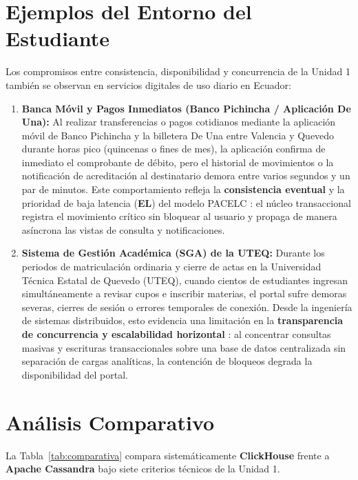 \documentclass[12pt,a4paper]{article}
\begin{document}
\section{Ejemplos del Entorno del Estudiante}
Los compromisos entre consistencia, disponibilidad y concurrencia de la Unidad 1 también se observan en servicios digitales de uso diario en Ecuador:

\begin{enumerate}[leftmargin=1.2cm]
    \item \textbf{Banca Móvil y Pagos Inmediatos (Banco Pichincha / Aplicación De Una):} Al realizar transferencias o pagos cotidianos mediante la aplicación móvil de Banco Pichincha y la billetera De Una entre Valencia y Quevedo durante horas pico (quincenas o fines de mes), la aplicación confirma de inmediato el comprobante de débito, pero el historial de movimientos o la notificación de acreditación al destinatario demora entre varios segundos y un par de minutos. Este comportamiento refleja la \textbf{consistencia eventual} y la prioridad de baja latencia (\textbf{EL}) del modelo PACELC \cite{vansteen2023distributed, newman2021building}: el núcleo transaccional registra el movimiento crítico sin bloquear al usuario y propaga de manera asíncrona las vistas de consulta y notificaciones.
    \item \textbf{Sistema de Gestión Académica (SGA) de la UTEQ:} Durante los periodos de matriculación ordinaria y cierre de actas en la Universidad Técnica Estatal de Quevedo (UTEQ), cuando cientos de estudiantes ingresan simultáneamente a revisar cupos e inscribir materias, el portal sufre demoras severas, cierres de sesión o errores temporales de conexión. Desde la ingeniería de sistemas distribuidos, esto evidencia una limitación en la \textbf{transparencia de concurrencia y escalabilidad horizontal} \cite{vansteen2023distributed, habib2024architecture}: al concentrar consultas masivas y escrituras transaccionales sobre una base de datos centralizada sin separación de cargas analíticas, la contención de bloqueos degrada la disponibilidad del portal.
\end{enumerate}

\section{Análisis Comparativo}
La Tabla~\ref{tab:comparativa} compara sistemáticamente \textbf{ClickHouse} frente a \textbf{Apache Cassandra} bajo siete criterios técnicos de la Unidad 1.
\end{document}
